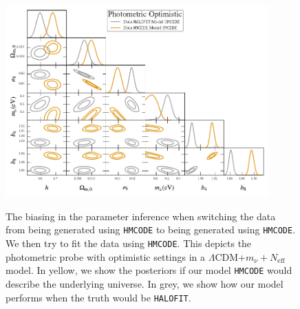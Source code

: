 \documentclass[oneside]{book}
\newcommand*{\halofit}{\texttt{HALOFIT}\xspace}
\newcommand*{\hmcode}{\texttt{HMCODE}\xspace}
\begin{document}
\begin{figure}[h]
    \centering
    \caption{The biasing in the parameter inference when switching the data from being generated using \hmcode to being generated using \hmcode. We then try to fit the data using \hmcode. This depicts the photometric probe with optimistic settings in a $\Lambda$CDM+$m_\nu+N_\mathrm{eff}$ model. In yellow, we show the posteriors if our model \hmcode would describe the underlying universe. In grey, we show how our model performs when the truth would be \halofit.}
    \includegraphics[width=0.9\textwidth]{P_Halofit_v_P_Hmcode_bias.pdf}
    \label{fig:triangle_HCvHM_biased}
\end{figure}
\end{document}
